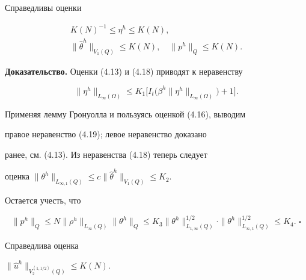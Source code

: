 \documentclass[12pt]{article}
\theoremstyle{plain} %
\newtheorem{propm}{\hskip\parindent Предложение}[section]
\theoremstyle{definition}
\numberwithin{equation}{section}
\begin{document}
\begin{propm} Справедливы оценки


\begin{gather}


K(N)^{-1}\le \eta^h\le K(N), \\


\|\widehat\theta^h\|_{V_1(Q)}\le K(N),\quad \|p^h\|_Q\le K(N).


\end{gather}


\end{propm}





{\bf Доказательство.} Оценки (4.13) и (4.18) приводят к неравенству


$$


\|\eta^h\|_{L_\infty(\Omega)}\le


K_1\bigl[I_t\bigl(\beta^h\|\eta^h\|_{L_\infty(\Omega)}\bigr)+1\bigr].


$$


Применяя лемму Гронуолла и пользуясь оценкой (4.16), выводим


правое неравенство (4.19); левое неравенство доказано


ранее, см. (4.13). Из неравенства (4.18) теперь следует


оценка $\|\theta^h\|_{L_{\infty,1}(Q)}


\le c\|\widehat\theta^h\|_{V_1(Q)}\le K_2$.


Остается учесть, что


$$\|p^h\|_Q\le


N\|\rho^h\|_{L_\infty(Q)}\|\theta^h\|_Q\le


K_3\|\theta^h\|_{L_{1,\infty}(Q)}^{1/2}\cdot




\|\theta^h\|_{L_{\infty,1}(Q)}^{1/2}\le K_4.\;\square


$$





\begin{propm} Справедлива оценка


$\|\widehat u^h\|_{V^{\left<1,1/2\right>}_2(Q)}\le K(N).$


\end{propm}
\end{document}
